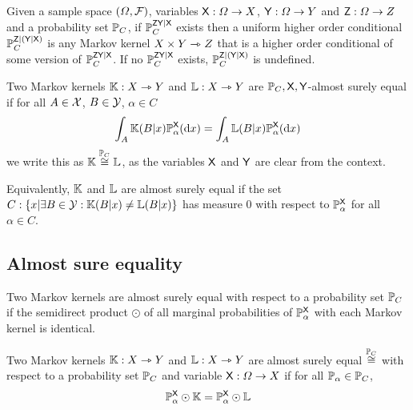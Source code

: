 \begin{definition}\label{def:ho_cprob_pset}
Given a sample space $(\Omega,\mathcal{F})$, variables $\mathsf{X}:\Omega\to X$, $\mathsf{Y}:\Omega\to Y$ and $\mathsf{Z}:\Omega\to Z$ and a probability set $\mathbb{P}_C$, if $\mathbb{P}_C^{\mathsf{ZY}|\mathsf{X}}$ exists then a uniform higher order conditional $\mathbb{P}_C^{\mathsf{Z}|(\mathsf{Y}|\mathsf{X})}$ is any Markov kernel $X\times Y\rightarrowtriangle Z$ that is a higher order conditional of some version of $\mathbb{P}_C^{\mathsf{ZY}|\mathsf{X}}$. If no $\mathbb{P}_C^{\mathsf{ZY}|\mathsf{X}}$ exists, $\mathbb{P}_C^{\mathsf{Z}|(\mathsf{Y}|\mathsf{X})}$ is undefined.
\end{definition}

\begin{definition}
Two Markov kernels $\mathbb{K}:X\rightarrowtriangle Y$ and $\mathbb{L}:X\rightarrowtriangle Y$ are $\mathbb{P}_C,\mathsf{X},\mathsf{Y}$-almost surely equal if for all $A\in\mathcal{X}$, $B\in \mathcal{Y}$, $\alpha\in C$
\begin{align}
    \int_A \mathbb{K}(B|x)\mathbb{P}_\alpha^{\mathsf{X}}(\mathrm{d}x) = \int_A\mathbb{L}(B|x)\mathbb{P}_\alpha^{\mathsf{X}}(\mathrm{d}x)
\end{align}
we write this as $\mathbb{K}\overset{\mathbb{P}_C}{\cong}\mathbb{L}$, as the variables $\mathsf{X}$ and $\mathsf{Y}$ are clear from the context.
\end{definition}

Equivalently, $\mathbb{K}$ and $\mathbb{L}$ are almost surely equal if the set $C:\{x|\exists B\in\mathcal{Y}:\mathbb{K}(B|x)\neq\mathbb{L}(B|x)\}$ has measure 0 with respect to $\mathbb{P}_\alpha^{\mathsf{X}}$ for all $\alpha\in C$.

\subsection{Almost sure equality}

Two Markov kernels are almost surely equal with respect to a probability set $\mathbb{P}_C$ if the semidirect product $\odot$ of all marginal probabilities of $\mathbb{P}_\alpha^{\mathsf{X}}$ with each Markov kernel is identical.

\begin{definition}\label{def:asequal}
Two Markov kernels $\mathbb{K}:X\rightarrowtriangle Y$ and $\mathbb{L}:X\rightarrowtriangle Y$ are almost surely equal $\overset{\mathbb{P}_C}{\cong}$ with respect to a probability set $\mathbb{P}_C$ and variable $\mathsf{X}:\Omega\to X$ if for all $\mathbb{P}_\alpha \in \mathbb{P}_C$,
\begin{align}
    \mathbb{P}^{\mathsf{X}}_\alpha\odot \mathbb{K}=\mathbb{P}^{\mathsf{X}}_\alpha\odot \mathbb{L}
\end{align}
\end{definition}

